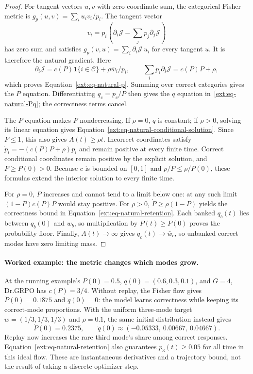 \documentclass{article}
\newcommand{\1}{\mathbf 1}
\theoremstyle{remark}
\theoremstyle{definition}
\theoremstyle{plain}
\begin{document}
\begin{proof}
For tangent vectors $u,v$ with zero coordinate sum, the categorical Fisher
metric is $g_p(u,v)=\sum_i u_iv_i/p_i$. The tangent vector
\[
 v_i=p_i\left(\partial_i\mathcal J-
                  \sum_jp_j\partial_j\mathcal J\right)
\]
has zero sum and satisfies $g_p(v,u)=\sum_i\partial_i\mathcal J\,u_i$
for every tangent $u$. It is therefore the natural gradient. Here
\[
 \partial_i\mathcal J=c(P)\mathbf 1\{i\in\mathcal C\}
                   +\rho\bar w_i/p_i,
 \qquad
 \sum_i p_i\partial_i\mathcal J=c(P)P+\rho,
\]
which proves Equation~\eqref{ext:eq-natural-p}. Summing over correct
categories gives the $P$ equation. Differentiating $q_c=p_c/P$ then gives
the $q$ equation in~\eqref{ext:eq-natural-Pq}; the correctness terms cancel.

The $P$ equation makes $P$ nondecreasing. If $\rho=0$, $q$ is constant;
if $\rho>0$, solving its linear equation gives
Equation~\eqref{ext:eq-natural-conditional-solution}. Since $P\le1$, this
also gives $A(t)\ge\rho t$. Incorrect coordinates satisfy
$\dot p_i=-(c(P)P+\rho)p_i$ and remain positive at every finite time.
Correct conditional coordinates remain positive by the explicit solution,
and $P\ge P(0)>0$. Because $c$ is bounded on $[0,1]$ and
$\rho/P\le\rho/P(0)$, these formulas extend the interior solution to every
finite time.

For $\rho=0$, $P$ increases and cannot tend to a limit below one: at any
such limit $(1-P)c(P)P$ would stay positive. For $\rho>0$,
$\dot P\ge\rho(1-P)$ yields the correctness bound in
Equation~\eqref{ext:eq-natural-retention}. Each banked $q_b(t)$ lies between
$q_b(0)$ and $w_b$, so multiplication by $P(t)\ge P(0)$ proves the
probability floor. Finally, $A(t)\to\infty$ gives $q_c(t)\to\bar w_c$, so unbanked
correct modes have zero limiting mass.
\end{proof}

\paragraph{Worked example: the metric changes which modes grow.}
At the running example's $P(0)=0.5$, $q(0)=(0.6,0.3,0.1)$, and $G=4$,
Dr.GRPO has $c(P)=3/4$. Without replay, the Fisher flow gives
$\dot P(0)=0.1875$ and $\dot q(0)=0$: the model learns correctness while
keeping its correct-mode proportions. With the uniform three-mode target
$w=(1/3,1/3,1/3)$ and $\rho=0.1$, the same initial distribution instead gives
\[
 \dot P(0)=0.2375,\qquad
 \dot q(0)\approx(-0.05333,\ 0.00667,\ 0.04667).
\]
Replay now increases the rare third mode's share among correct responses.
Equation~\eqref{ext:eq-natural-retention} also guarantees $p_3(t)\ge0.05$
for all time in this ideal flow. These are instantaneous derivatives and a
trajectory bound, not the result of taking a discrete optimizer step.
\end{document}
